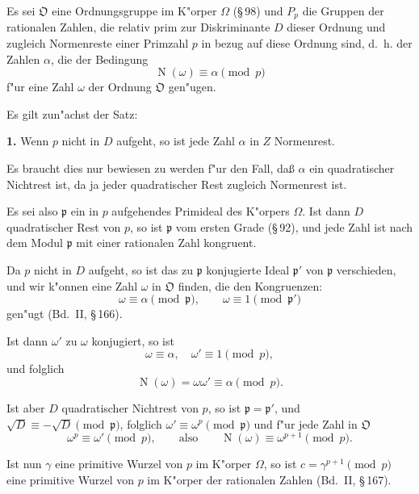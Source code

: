 \documentclass[11pt,a4paper]{article}
\theoremstyle{plain}
\newcommand{\sect}[1]{\S\,#1}
\DeclareMathOperator{\Norm}{N}
\begin{document}
Es sei $\mathfrak{O}$ eine Ordnungsgruppe im K"{o}rper $\Omega$ (\sect{98}) und $P_p$ die Gruppen der rationalen Zahlen, die relativ prim zur Diskriminante $D$ dieser Ordnung und zugleich Normenreste einer Primzahl $p$ in bezug auf diese Ordnung sind, d.~h. der Zahlen $\alpha$, die der Bedingung
\begin{equation}
\label{eq:108_1}
\Norm(\omega) \equiv \alpha \pmod{p}
\end{equation}
f"{u}r eine Zahl $\omega$ der Ordnung $\mathfrak{O}$ gen"{u}gen.

Es gilt zun"{a}chst der Satz:

\smallskip

\textbf{1.} Wenn $p$ nicht in $D$ aufgeht, so ist jede Zahl $\alpha$ in $Z$ Normenrest.

Es braucht dies nur bewiesen zu werden f"{u}r den Fall, da\ss{} $\alpha$ ein quadratischer Nichtrest ist, da ja jeder quadratischer Rest zugleich Normenrest ist.

Es sei also $\mathfrak{p}$ ein in $p$ aufgehendes Primideal des K"{o}rpers $\Omega$. Ist dann $D$ quadratischer Rest von $p$, so ist $\mathfrak{p}$ vom ersten Grade (\sect{92}), und jede Zahl ist nach dem Modul $\mathfrak{p}$ mit einer rationalen Zahl kongruent.

Da $p$ nicht in $D$ aufgeht, so ist das zu $\mathfrak{p}$ konjugierte Ideal $\mathfrak{p}'$ von $\mathfrak{p}$ verschieden, und wir k"{o}nnen eine Zahl $\omega$ in $\mathfrak{O}$ finden, die den Kongruenzen:
\begin{equation}
\label{eq:108_2}
\omega \equiv \alpha \pmod{\mathfrak{p}}, \qquad \omega \equiv 1 \pmod{\mathfrak{p}'}
\end{equation}
gen"{u}gt (Bd.~II, \sect{166}).

Ist dann $\omega'$ zu $\omega$ konjugiert, so ist
\[
\omega \equiv \alpha, \quad \omega' \equiv 1 \pmod{p},
\]
und folglich
\[
\Norm(\omega) = \omega\omega' \equiv \alpha \pmod{p}.
\]

Ist aber $D$ quadratischer Nichtrest von $p$, so ist $\mathfrak{p} = \mathfrak{p}'$, und $\sqrt{D} \equiv -\sqrt{D} \pmod{\mathfrak{p}}$, folglich $\omega' \equiv \omega^{p} \pmod{\mathfrak{p}}$ und f"{u}r jede Zahl in $\mathfrak{O}$
\begin{equation}
\label{eq:108_3}
\omega^p \equiv \omega' \pmod{p}, \qquad \text{also} \qquad \Norm(\omega) \equiv \omega^{p+1} \pmod{p}.
\end{equation}

Ist nun $\gamma$ eine primitive Wurzel von $p$ im K"{o}rper $\Omega$, so ist $c = \gamma^{p+1} \pmod{p}$ eine primitive Wurzel von $p$ im K"{o}rper der rationalen Zahlen (Bd.~II, \sect{167}).
\end{document}
